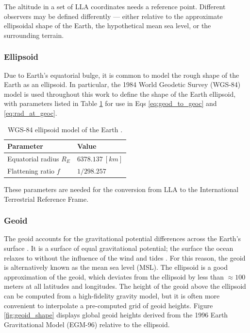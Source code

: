The altitude in a set of LLA coordinates needs a reference point. Different observers may be defined differently --- either relative to the approximate ellipsoidal shape of the Earth, the hypothetical mean sea level, or the surrounding terrain.

\subsubsection{Ellipsoid}

Due to Earth's equatorial bulge, it is common to model the rough shape of the Earth as an ellipsoid. In particular, the 1984 World Geodetic Survey (WGS-84) model is used throughout this work to define the shape of the Earth ellipsoid, with parameters listed in Table \ref{tb:wgs84} for use in Eqs \ref{eq:geod_to_geoc} and \ref{eq:rad_at_geoc}.

\begin{table}[ht]
  \centering
  \begin{tabular}{|l|l|}
  \hline
  \textbf{Parameter} & \textbf{Value}              \\ \hline
  Equatorial radius $R_E$             & $6378.137 \: [km]$ \\ \hline
  Flattening ratio $f$                & $1 / 298.257$      \\ \hline
  \end{tabular}
  \caption{WGS-84 ellipsoid model of the Earth \cite{vallado4ed}.}
  \label{tb:wgs84}
\end{table}

These parameters are needed for the conversion from LLA to the International Terrestrial Reference Frame.

\subsubsection{Geoid}

The geoid accounts for the gravitational potential differences across the Earth's surface \cite{vallado4ed}. It is a surface of equal gravitational potential; the surface the ocean relaxes to without the influence of the wind and tides \cite{vallado4ed}. For this reason, the geoid is alternatively known as the mean sea level (MSL). The ellipsoid is a good approximation of the geoid, which deviates from the ellipsoid by less than $\approx 100$ meters at all latitudes and longitudes. The height of the geoid above the ellipsoid can be computed from a high-fidelity gravity model, but it is often more convenient to interpolate a pre-computed grid of geoid heights. Figure \ref{fig:geoid_shape} displays global geoid heights derived from the 1996 Earth Gravitational Model (EGM-96) relative to the ellipsoid.

